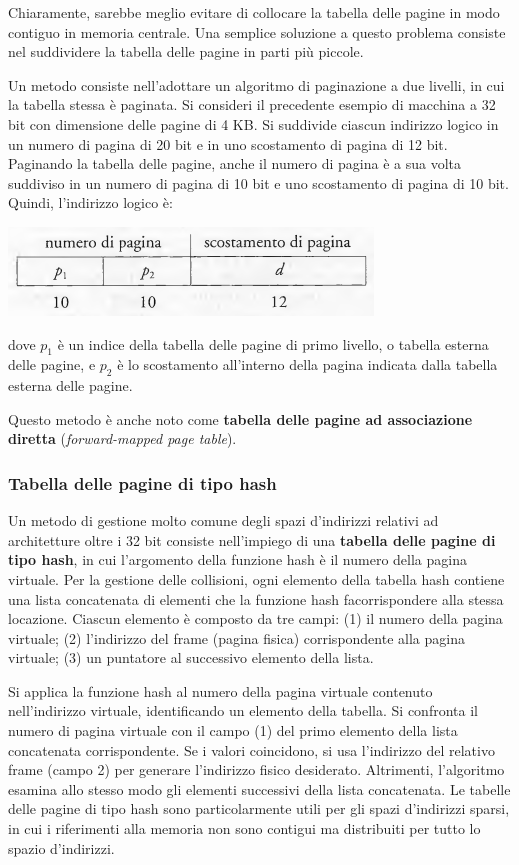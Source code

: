 \documentclass[11pt,a4paper]{article}
\begin{document}
Chiaramente, sarebbe meglio evitare di col­locare la tabella delle pagine in modo contiguo in memoria centrale. Una semplice soluzio­ne a questo problema consiste nel suddividere la tabella delle pagine in parti più piccole.

Un metodo consiste nell'adottare un algoritmo di paginazione a due livelli, in cui la
tabella stessa è paginata. Si consideri il precedente esempio di macchina a 32
bit con dimensione delle pagine di 4 KB. Si suddivide ciascun indirizzo logico in un nume­ro di pagina di 20 bit e in uno scostamento di pagina di 12 bit. Paginando la tabella delle pagine, anche il numero di pagina è a sua volta suddiviso in un numero di pagina di 10 bit
e uno scostamento di pagina di 10 bit. Quindi, l'indirizzo logico è:
\begin{center}
  \includegraphics[scale=0.6]{img/0039.png}
\end{center}
dove $p_1$ è un indice della tabella delle pagine di primo livello, o tabella esterna delle pagine,
e $p_2$ è lo scostamento all'interno della pagina indicata dalla tabella esterna delle pagine.

Questo metodo è anche noto come \textbf{tabella delle pagine ad associazione diretta}
(\emph{forward-mapped page table}).

\subsubsection{Tabella delle pagine di tipo hash}
Un metodo di gestione molto comune degli spazi d'indirizzi relativi ad architetture oltre i
32 bit consiste nell'impiego di una \textbf{tabella delle pagine di tipo hash}, in cui l'argomento del­la funzione hash è il numero della pagina virtuale. Per la gestione delle collisioni, ogni ele­mento della tabella hash contiene una lista concatenata di elementi che la funzione hash facorrispondere alla stessa locazione. Ciascun elemento è composto da tre campi: (1) il numero della pagina virtuale; (2) l'indirizzo del frame (pagina fisica) corrispondente alla pagina
virtuale; (3) un puntatore al successivo elemento della lista.

Si applica la funzione hash al numero della pagina vir­tuale contenuto nell'indirizzo virtuale, identificando un elemento della tabella. Si confronta
il numero di pagina virtuale con il campo (1) del primo elemento della lista concatenata
corrispondente. Se i valori coincidono, si usa l'indirizzo del relativo frame (campo 2) per ge­nerare l'indirizzo fisico desiderato. Altrimenti, l'algoritmo esamina allo stesso modo gli ele­menti successivi della lista concatenata. Le tabelle delle pagine di tipo hash so­no particolarmente utili per gli spazi d'indirizzi sparsi, in cui i riferimenti alla memoria non
sono contigui ma distribuiti per tutto lo spazio d'indirizzi.
\end{document}
